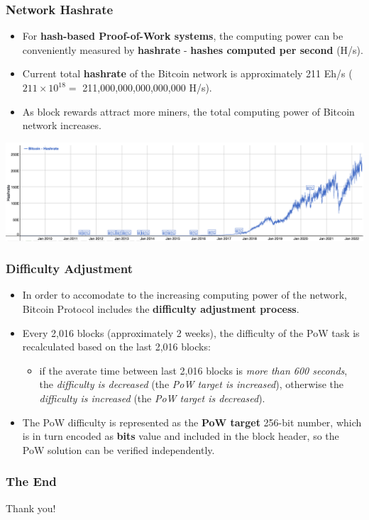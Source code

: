 \documentclass{beamer}
\begin{document}
\begin{frame}
  \frametitle{Network Hashrate}
  \begin{itemize}
  \item For \textbf{hash-based Proof-of-Work systems}, the computing power can
    be conveniently measured by \textbf{hashrate} - \textbf{hashes computed per
      second} (H/s).
  \item Current total \textbf{hashrate} of the Bitcoin network is approximately
    211 Eh/s ($211 \times 10^{18} = $ 211,000,000,000,000,000 H/s).
  \item As block rewards attract more miners, the total computing power of
    Bitcoin network increases.
  \end{itemize}
  \includegraphics[width=\textwidth]{hashrate}
\end{frame}

\begin{frame}
  \frametitle{Difficulty Adjustment}
  \begin{itemize}
  \item In order to accomodate to the increasing computing power of the network,
    Bitcoin Protocol includes the \textbf{difficulty adjustment process}.
  \item Every 2,016 blocks (approximately 2 weeks), the difficulty of the PoW
    task is recalculated based on the last 2,016 blocks:
    \begin{itemize}
    \item if the averate time between last 2,016 blocks is \textit{more than 600
        seconds}, the \textit{difficulty is decreased} (the \textit{PoW target
        is increased}), otherwise the \textit{difficulty is increased} (the
      \textit{PoW target is decreased}).
    \end{itemize}
  \item The PoW difficulty is represented as the \textbf{PoW target} 256-bit
    number, which is in turn encoded as \textbf{bits} value and included in the
    block header, so the PoW solution can be verified independently.
  \end{itemize}
\end{frame}

\begin{frame}
  \frametitle{The End}
  \begin{center}
    Thank you!
  \end{center}
\end{frame}
\end{document}
